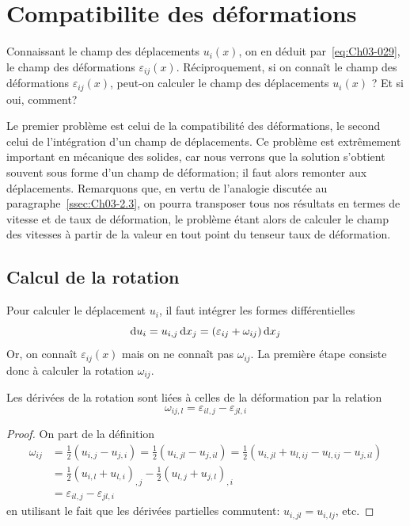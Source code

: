 \section{Compatibilite des déformations} \label{sec:Ch03-3}
Connaissant le champ des déplacements $u_i (x)$, on en déduit par~\eqref{eq:Ch03-029}, le champ des déformations $\varepsilon_{ij}(x)$.
Réciproquement, si on connaît le champ des déformations $\varepsilon_{ij}(x)$, peut-on calculer le champ des déplacements $u_i (x)$ ? Et si oui, comment?

Le premier problème est celui de la compatibilité des déformations, le second celui de l'intégration d'un champ de déplacements.
Ce problème est extrêmement important en mécanique des solides, car nous verrons que la solution s'obtient souvent sous forme d'un champ de déformation; il faut alors remonter aux déplacements.
Remarquons que, en vertu de l'analogie discutée au paragraphe~\ref{ssec:Ch03-2.3}, on pourra transposer tous nos résultats en termes de vitesse et de taux de déformation, le problème étant alors de calculer le champ des vitesses à partir de la valeur en tout point du tenseur taux de déformation.
\subsection{Calcul de la rotation} \label{ssec:Ch03-3.1}
Pour calculer le déplacement $u_i$, il faut intégrer les formes différentielles 
\begin{equation}
    \mathop{\mathrm{{}d}}\mathopen{} u_i = u_{i,j} \mathop{\mathrm{{}d}}\mathopen{} x_j = \left( \varepsilon_{ij} + \omega_{ij} \right) \mathop{\mathrm{{}d}}\mathopen{} x_j
    \label{eq:Ch03-051}
\end{equation}
Or, on connaît $\varepsilon_{ij}(x)$ mais on ne connaît pas $\omega_{ij}$.
La première étape consiste donc à calculer la rotation $\omega_{ij}$.
\begin{lem} \label{lem:Ch03-1}
    Les dérivées de la rotation sont liées à celles de la déformation par la relation
    \begin{equation}
        \omega_{ij,l} = \varepsilon_{il,j} - \varepsilon_{jl,i}
        \label{eq:Ch03-052}
    \end{equation}
\end{lem}
\begin{proof}
    On part de la définition 
    \begin{align*}
        \omega_{ij} &= \frac{1}{2} \left( u_{i,j} - u_{j,i} \right) = \frac{1}{2} \left( u_{i,jl} - u_{j,il} \right) = \frac{1}{2} \left( u_{i,jl} + u_{l,ij} - u_{l,ij} - u_{j,il} \right) \\
        &= \frac{1}{2} \left( u_{i,l} + u_{l,i} \right)_{,j} - \frac{1}{2} \left( u_{l,j} + u_{j,l} \right)_{,i} \\
        &= \varepsilon_{il,j} - \varepsilon_{jl,i}
    \end{align*}
    en utilisant le fait que les dérivées partielles commutent: $u_{i,jl} = u_{i,lj}$, etc.
\end{proof}

